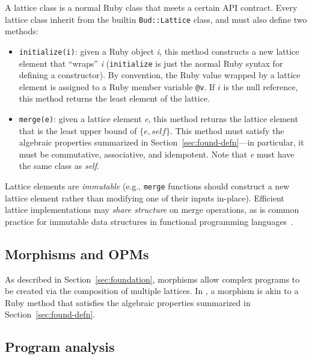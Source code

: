 A lattice class is a normal Ruby class that meets a certain API contract. Every
lattice class inherit from the builtin \texttt{Bud::Lattice} class, and
must also define two methods:
\begin{itemize}
\item \texttt{initialize(i)}: given a Ruby object \emph{i}, this method
  constructs a new lattice element that ``wraps'' \emph{i} (\texttt{initialize}
  is just the normal Ruby syntax for defining a constructor). By convention, the
  Ruby value wrapped by a lattice element is assigned to a Ruby member variable
  \texttt{@v}. If $i$ is the null reference, this method returns the least
  element of the lattice.

\item \texttt{merge(e)}: given a lattice element \emph{e}, this method returns the
  lattice element that is the least upper bound of $\{e, \textit{self}\}$. This method must
  satisfy the algebraic properties summarized in Section~\ref{sec:found-defn}---in
  particular, it must be commutative, associative, and idempotent. Note that
  \emph{e} must have the same class as \emph{self}.
\end{itemize}
Lattice elements are \emph{immutable} (e.g., \texttt{merge} functions should
construct a new lattice element rather than modifying one of their inputs
in-place). Efficient lattice implementations may \emph{share structure} on merge
operations, as is common practice for immutable data structures in functional
programming languages~\cite{Okasaki1999}. %

\subsection{Morphisms and OPMs}
As described in Section~\ref{sec:foundation}, morphisms allow complex programs
to be created via the composition of multiple lattices. In \lang, a morphism is
akin to a Ruby method that satisfies the algebraic properties summarized in
Section~\ref{sec:found-defn}.

\subsection{Program analysis}

